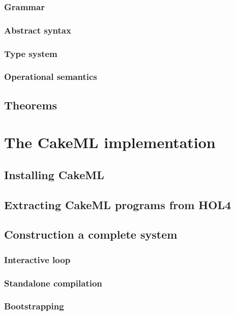 \documentclass[12pt,a4paper]{book}
\begin{document}
\section{Grammar}

\section{Abstract syntax}

\section{Type system}

\section{Operational semantics}

\chapter{Theorems}


\part{The CakeML implementation}

\chapter{Installing CakeML}

\chapter{Extracting CakeML programs from HOL4}

\chapter{Construction a complete system}

\section{Interactive loop}

\section{Standalone compilation}

\section{Bootstrapping}
\end{document}

